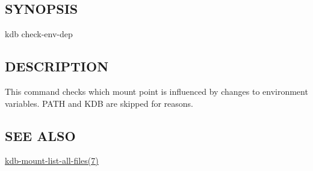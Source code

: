 \subsection*{S\+Y\+N\+O\+P\+S\+IS}

{\ttfamily kdb check-\/env-\/dep}

\subsection*{D\+E\+S\+C\+R\+I\+P\+T\+I\+ON}

This command checks which mount point is influenced by changes to environment variables. {\ttfamily P\+A\+TH} and {\ttfamily K\+DB} are skipped for reasons.

\subsection*{S\+EE A\+L\+SO}


\begin{DoxyItemize}
\item \hyperlink{doc_help_kdb-mount-list-all-files_md}{kdb-\/mount-\/list-\/all-\/files(7)} 
\end{DoxyItemize}